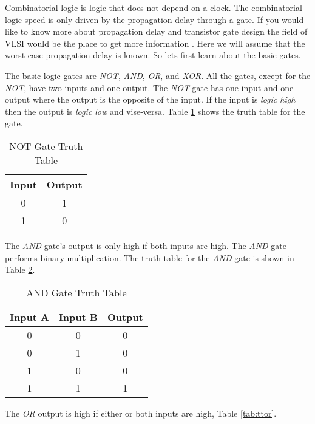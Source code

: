 Combinatorial logic is logic that does not depend on a clock. The combinatorial logic speed is only driven by the propagation delay through a gate. If you would like to know more about propagation delay and transistor gate design the field of \ac{VLSI} would be the place to get more information \cite{uyemura2002introduction}. Here we will assume that the worst case propagation delay is known. So lets first learn about the basic gates.
	
The basic logic gates are \emph{NOT}, \emph{AND}, \emph{OR}, and \emph{XOR}. All the gates, except for the \emph{NOT}, have two inputs and one output. The \emph{NOT} gate has one input and one output where the output is the opposite of the input. If the input is \emph{logic high} then the output is \emph{logic low} and vise-versa. Table \ref{tab:ttnot} shows the truth table for the gate.
	
\begin{table}[!ht]  
\begin{center}    
\caption{NOT Gate Truth Table} 
\label{tab:ttnot} 
\begin{tabular}{|c|c|}  
\textbf{Input} & \textbf{Output}\\  
\hline  
0 & 1\\  
1 & 0\\ 
\end{tabular}  
\end{center}
\end{table}

The \emph{AND} gate's output is only high if both inputs are high. The \emph{AND} gate performs binary multiplication. The truth table for the \emph{AND} gate is shown in Table \ref{tab:ttand}.

\begin{table}[h!]  
\begin{center}    
\caption{AND Gate Truth Table} 
\label{tab:ttand} \begin{tabular}{|c|c|c|}  
\textbf{Input A} & \textbf{Input B} & \textbf{Output}\\  
\hline  
0 & 0 & 0\\  
0 & 1 & 0\\  
1 & 0 & 0\\  
1 & 1 & 1\\ 
\end{tabular}  
\end{center}
\end{table}

The \emph{OR} output is high if either or both inputs are high, Table \ref{tab:ttor}.

